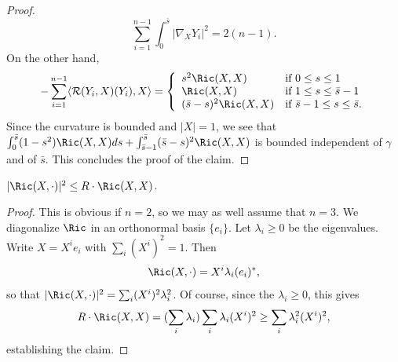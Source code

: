 \begin{proof}
$$\sum_{i=1}^{n-1}\int_0^{\bar s}|\nabla_XY_i|^2=2(n-1).$$
On the other hand,
$$-\sum_{i=1}^{n-1}\langle{\mathcal R}(Y_i,X)(Y_i),X\rangle =\left\{
\begin{array}{ll} s^2\Ric(X,X) & \mbox{if $0\le s\le 1$} \\
\Ric(X,X) & \mbox{if $1\le s\le \bar s-1$} \\ (\bar s-s)^2
\Ric(X,X) & \mbox{if $\bar s-1\le s\le \bar s$.} \end{array} \right.
$$ Since the curvature is bounded and $|X|=1$, we see that
$\int_0^{\bar s}(1-s^2)\Ric(X,X)ds+\int_{\bar s-1}^{\bar
s}(\bar s-s)^2\Ric(X,X)$ is bounded independent of $\gamma$ and
of $\bar s$. This concludes the proof of the claim.
\end{proof}

\begin{claim}\label{claim:ricci-cauchy-schwarz-bound}
$|\Ric(X,\cdot)|^2\le R \cdot \Ric(X,X)$.
\end{claim}


\begin{proof}
This is obvious if $n=2$, so we may as well assume that $n=3$. We
diagonalize $\Ric$ in an orthonormal basis $\{e_i\}$. Let
$\lambda_i\ge 0$
 be the eigenvalues. Write $X=X^ie_i$ with $\sum_i(X^i)^2=1$. Then
$$\Ric(X,\cdot)=X^i\lambda_i(e_i)^*,$$ so that
$|\Ric(X,\cdot)|^2=\sum_i(X^i)^2\lambda_i^2$. Of course, since
the $\lambda_i\ge 0$, this gives
$$R\cdot \Ric(X,X)=(\sum_i\lambda_i)\sum_i\lambda_i(X^i)^2\ge
\sum_i\lambda_i^2(X^i)^2,$$ establishing the claim.
\end{proof}


